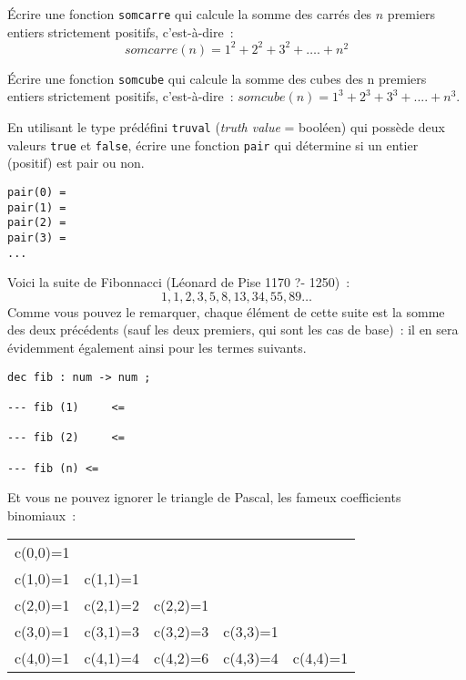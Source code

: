 \begin{exercice}
 Écrire une fonction \texttt{somcarre} qui calcule la somme des carrés des $n$ premiers entiers strictement positifs, c'est-à-dire~:	
$$ somcarre(n) =   1^2+2^2+3^2+\ldots.+n^2$$

\end{exercice}
\begin{exercice}
 Écrire une fonction \texttt{somcube} qui calcule la somme des cubes des n premiers entiers strictement positifs, c'est-à-dire~:	
$somcube(n) =   1^3+2^3+3^3+....+n^3$.
\end{exercice}	

\begin{exercice}	
 En utilisant le type prédéfini \texttt{truval} (\emph{truth value} =
 booléen) qui possède deux valeurs \texttt{true} et \texttt{false}, écrire une fonction
 \texttt{pair} qui détermine si un entier (positif) est pair ou non.
	
\begin{verbatim}
pair(0) =
pair(1) =
pair(2) =
pair(3) = 
...
\end{verbatim}
\end{exercice}



\begin{exercice}
Voici la suite de Fibonnacci  (Léonard de Pise 1170 ?- 1250)~:
$$ 1, 1, 2, 3, 5, 8, 13, 34, 55, 89 \ldots $$ Comme vous pouvez le remarquer,
chaque élément de cette suite est la somme des deux précédents (sauf
les deux premiers, qui sont les cas de base)~: il en sera évidemment
également ainsi pour les termes suivants.
\begin{verbatim}
dec fib : num -> num ;

--- fib (1) 	<=

--- fib (2) 	<=	

--- fib (n)	<=
\end{verbatim}
\end{exercice}

\begin{exercice}
Et vous ne pouvez ignorer le triangle de Pascal, les fameux
coefficients binomiaux~:
\begin{tabular}{lllll}
c(0,0)=1 \\
c(1,0)=1 &	c(1,1)=1\\
c(2,0)=1&	c(2,1)=2	&c(2,2)=1 \\
c(3,0)=1	&c(3,1)=3	&c(3,2)=3	&c(3,3)=1 \\
c(4,0)=1 	&c(4,1)=4 	&c(4,2)=6 	&c(4,3)=4	&c(4,4)=1\\
\end{tabular}


\end{exercice}


